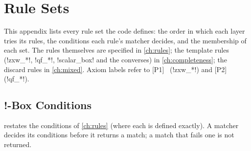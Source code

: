 \chapter{Rule Sets}\label{app:rules}

\providecommand{\rulescn}[1]{\nolinkurl{#1}}

This appendix lists every rule set the code defines: the order in which each layer tries its rules, the \bbox{} conditions each rule's matcher decides, and the membership of each set. The rules themselves are specified in \cref{ch:rules}; the template rules (\azx!zxw_*!, \azx!qf_*!, \azx!scalar_box! and the converses) in \cref{ch:completeness}; the discard rules in \cref{ch:mixed}. Axiom labels refer to [P1]~\cite{poor2023zxw} (\azx!zxw_*!) and [P2]~\cite{wang2023qufinitezxw} (\azx!qf_*!).

\section{!-Box Conditions}\label{sec:app-rules-boxes}

 restates the \bbox{} conditions of \cref{ch:rules} (where each is defined exactly). A matcher decides its conditions before it returns a match; a match that fails one is not returned.

